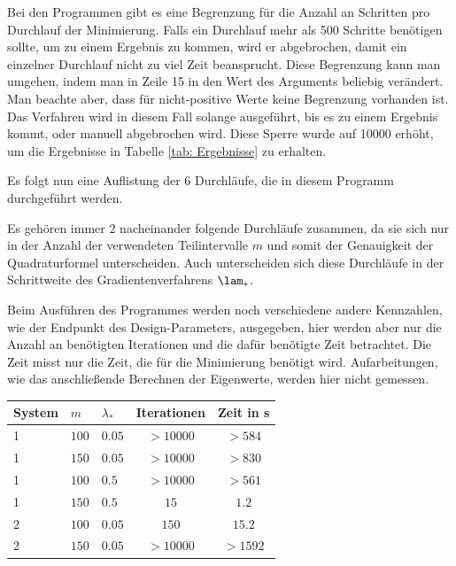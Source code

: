 \documentclass[a4paper,12pt]{report}
\newcommand{\zitat}[1]{\glqq #1\grqq}
\newcommand{\1}{\mathds{1}}
\theoremstyle{plain} %
\theoremstyle{definition} %
\theoremstyle{remark}
\begin{document}
            Bei den Programmen gibt es eine Begrenzung für die Anzahl an Schritten pro Durchlauf der Minimierung.
            Falls ein Durchlauf mehr als 500 Schritte benötigen sollte, um zu einem Ergebnis zu kommen, wird er abgebrochen, damit ein einzelner Durchlauf nicht zu viel Zeit beansprucht.
            Diese Begrenzung kann man umgehen, indem man in Zeile 15 in  den Wert des Arguments \nolinebreak[4]{\zitat{maxIter}} beliebig verändert.
            Man beachte aber, dass für nicht-positive Werte keine Begrenzung vorhanden ist.
            Das Verfahren wird in diesem Fall solange ausgeführt, bis es zu einem Ergebnis kommt, oder manuell abgebrochen wird.
            Diese Sperre wurde auf 10000 erhöht, um die Ergebnisse in Tabelle \ref{tab: Ergebnisse} zu erhalten.

            Es folgt nun eine Auflistung der 6 Durchläufe, die in diesem Programm durchgeführt werden.

            Es gehören immer 2 nacheinander folgende Durchläufe zusammen, da sie sich nur in der Anzahl der verwendeten Teilintervalle $m$
            und somit der Genauigkeit der Quadraturformel unterscheiden.
            Auch unterscheiden sich diese Durchläufe in der Schrittweite des Gradientenverfahrens $\lam_*$.

            Beim Ausführen des Programmes werden noch verschiedene andere Kennzahlen, wie der Endpunkt des Design-Parameters, ausgegeben,
            hier werden aber nur die Anzahl an benötigten Iterationen und die dafür benötigte Zeit betrachtet.
            Die Zeit misst nur die Zeit, die für die Minimierung benötigt wird.
            Aufarbeitungen, wie das anschließende Berechnen der Eigenwerte, werden hier nicht gemessen. \\

            \begin{table}[ht]
                  \centering
                  \begin{tabular}{lllcc}
                       System & $m$ & $\lambda_*$ & Iterationen & Zeit in s\\
                       \hline
                       1 & $100$ & $0.05$ & $>10000$ & $>584$ \\ 
                       1 & $150$ & $0.05$ & $>10000$ & $>830$ \\
                       \hline
                       1 & $100$ & $0.5$ & $>10000$ & $>561$ \\
                       1 & $150$ & $0.5$ & $15$ & $1.2$ \\
                       \hline
                       2 & $100$ & $0.05$ & $150$ & $15.2$ \\
                       2 & $150$ & $0.05$ & $>10000$ & $>1592$ \\
                       \hline
                  \end{tabular}\\
            \end{table}
\end{document}
